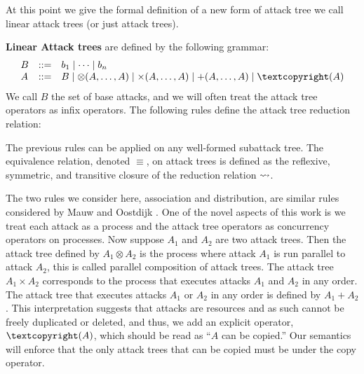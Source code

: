 \begin{full}
At this point we give the formal definition of a new form of attack
tree we call linear attack trees (or just attack trees).
\begin{definition}
  \label{def:unlabeled-attack-trees}
  \textbf{Linear Attack trees} are defined by the following grammar:
  \[
  \begin{array}{lll}
    B & ::= & b_1 \mid \cdots \mid b_n\\
    A & ::= & B \mid \otimes(A,\ldots,A) \mid \times(A,\ldots,A) \mid +(A,\ldots,A) \mid \cpy(A)\\
  \end{array}
  \]
  We call $B$ the set of base attacks, and we will often treat the
  attack tree operators as infix operators.  The following rules
  define the attack tree reduction relation:
  \begin{center}
    \vspace{-25px}
  \end{center}
  The previous rules can be applied on any well-formed subattack
  tree. The equivalence relation, denoted $\equiv$, on attack trees is
  defined as the reflexive, symmetric, and transitive closure of the
  reduction relation $\rightsquigarrow$.
\end{definition}
The two rules we consider here, association and distribution, are
similar rules considered by Mauw and Oostdijk \cite{Mauw:2006}. One of
the novel aspects of this work is we treat each attack as a process
and the attack tree operators as concurrency operators on processes.
Now suppose $A_1$ and $A_2$ are two attack trees.  Then the attack
tree defined by $A_1 \otimes A_2$ is the process where attack $A_1$ is
run parallel to attack $A_2$, this is called parallel composition of
attack trees. The attack tree $A_1 \times A_2$ corresponds to the
process that executes attacks $A_1$ and $A_2$ in any order.  The
attack tree that executes attacks $A_1$ or $A_2$ in any order is
defined by $A_1 + A_2$.  This interpretation suggests that attacks are
resources and as such cannot be freely duplicated or deleted, and
thus, we add an explicit operator, $\cpy(A)$, which should be read as
``$A$ can be copied.''  Our semantics will enforce that the only
attack trees that can be copied must be under the copy operator.


\end{full}

